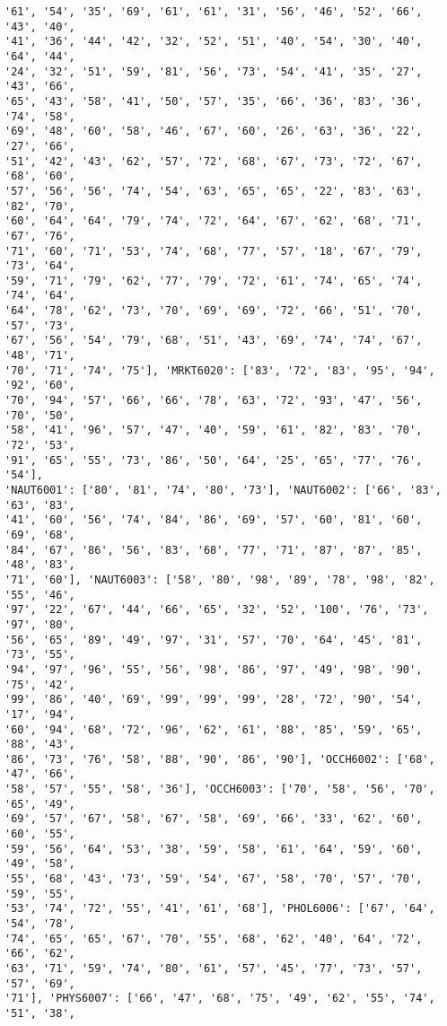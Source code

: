 \documentclass[11pt]{article}
\begin{document}
\begin{Verbatim}[commandchars=\\\{\}]
'61', '54', '35', '69', '61', '61', '31', '56', '46', '52', '66', '43', '40',
'41', '36', '44', '42', '32', '52', '51', '40', '54', '30', '40', '64', '44',
'24', '32', '51', '59', '81', '56', '73', '54', '41', '35', '27', '43', '66',
'65', '43', '58', '41', '50', '57', '35', '66', '36', '83', '36', '74', '58',
'69', '48', '60', '58', '46', '67', '60', '26', '63', '36', '22', '27', '66',
'51', '42', '43', '62', '57', '72', '68', '67', '73', '72', '67', '68', '60',
'57', '56', '56', '74', '54', '63', '65', '65', '22', '83', '63', '82', '70',
'60', '64', '64', '79', '74', '72', '64', '67', '62', '68', '71', '67', '76',
'71', '60', '71', '53', '74', '68', '77', '57', '18', '67', '79', '73', '64',
'59', '71', '79', '62', '77', '79', '72', '61', '74', '65', '74', '74', '64',
'64', '78', '62', '73', '70', '69', '69', '72', '66', '51', '70', '57', '73',
'67', '56', '54', '79', '68', '51', '43', '69', '74', '74', '67', '48', '71',
'70', '71', '74', '75'], 'MRKT6020': ['83', '72', '83', '95', '94', '92', '60',
'70', '94', '57', '66', '66', '78', '63', '72', '93', '47', '56', '70', '50',
'58', '41', '96', '57', '47', '40', '59', '61', '82', '83', '70', '72', '53',
'91', '65', '55', '73', '86', '50', '64', '25', '65', '77', '76', '54'],
'NAUT6001': ['80', '81', '74', '80', '73'], 'NAUT6002': ['66', '83', '63', '83',
'41', '60', '56', '74', '84', '86', '69', '57', '60', '81', '60', '69', '68',
'84', '67', '86', '56', '83', '68', '77', '71', '87', '87', '85', '48', '83',
'71', '60'], 'NAUT6003': ['58', '80', '98', '89', '78', '98', '82', '55', '46',
'97', '22', '67', '44', '66', '65', '32', '52', '100', '76', '73', '97', '80',
'56', '65', '89', '49', '97', '31', '57', '70', '64', '45', '81', '73', '55',
'94', '97', '96', '55', '56', '98', '86', '97', '49', '98', '90', '75', '42',
'99', '86', '40', '69', '99', '99', '99', '28', '72', '90', '54', '17', '94',
'60', '94', '68', '72', '96', '62', '61', '88', '85', '59', '65', '88', '43',
'86', '73', '76', '58', '88', '90', '86', '90'], 'OCCH6002': ['68', '47', '66',
'58', '57', '55', '58', '36'], 'OCCH6003': ['70', '58', '56', '70', '65', '49',
'69', '57', '67', '58', '67', '58', '69', '66', '33', '62', '60', '60', '55',
'59', '56', '64', '53', '38', '59', '58', '61', '64', '59', '60', '49', '58',
'55', '68', '43', '73', '59', '54', '67', '58', '70', '57', '70', '59', '55',
'53', '74', '72', '55', '41', '61', '68'], 'PHOL6006': ['67', '64', '54', '78',
'74', '65', '65', '67', '70', '55', '68', '62', '40', '64', '72', '66', '62',
'63', '71', '59', '74', '80', '61', '57', '45', '77', '73', '57', '57', '69',
'71'], 'PHYS6007': ['66', '47', '68', '75', '49', '62', '55', '74', '51', '38',

\end{Verbatim}
\end{document}
